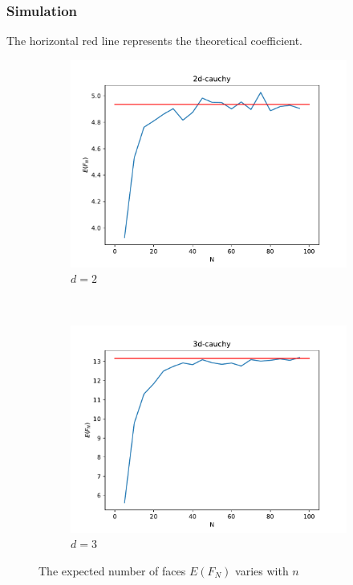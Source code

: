 \documentclass{beamer}
\begin{document}
\begin{frame}
    \frametitle{Simulation}
    The horizontal red line represents the theoretical coefficient.
    \begin{figure}
        \centering
        \begin{subfigure}[b]{0.5\linewidth}
        \includegraphics[width=\textwidth]{fig/2d-cauchy.pdf}
        \caption{$d=2$}
        \label{fig:2d_cauchy}
        \end{subfigure}~
        \begin{subfigure}[b]{0.5\linewidth}
          \includegraphics[width=\textwidth]{fig/3d-cauchy.pdf}
          \caption{$d=3$}
          \label{fig:3d_cauchy}
          \end{subfigure}
          \caption{The expected number of faces $E(F_N)$ varies with $n$}
      \end{figure}
\end{frame}
\end{document}
